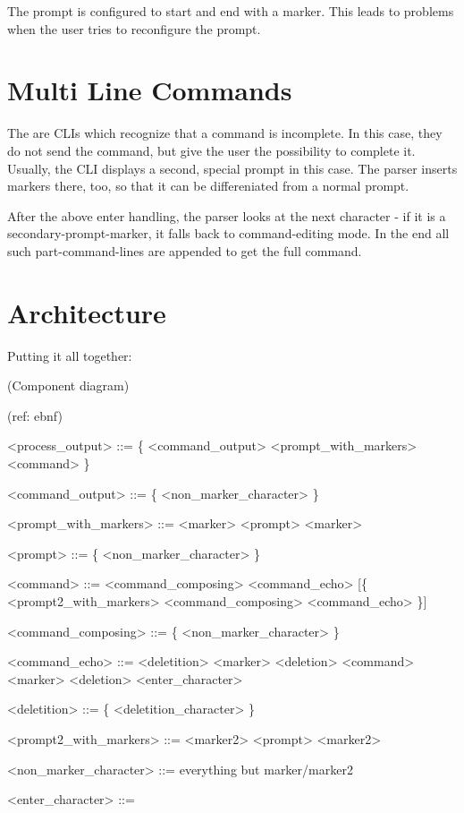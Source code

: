 \documentclass[twoside]{scrreprt}
\begin{document}
The prompt is configured to start and end with a marker. This leads to problems when the user tries to reconfigure the prompt.

\section{Multi Line Commands}

The are CLIs which recognize that a command is incomplete. In this case, they do not send the command, but give the user the possibility to complete it. Usually, the CLI displays a second, special prompt in this case. The parser inserts markers there, too, so that it can be differeniated from a normal prompt.

After the above enter handling, the parser looks at the next character - if it is a secondary-prompt-marker, it falls back to command-editing mode. In the end all such part-command-lines are appended to get the full command.

\section{Architecture}

Putting it all together:

(Component diagram)

(ref: ebnf)


\begin{grammar}
<process_output> ::= \{ <command_output> <prompt_with_markers> <command> \}

<command_output> ::= \{ <non_marker_character> \}

<prompt_with_markers> ::= <marker> <prompt> <marker>

<prompt> ::= \{ <non_marker_character> \}

<command> ::= <command_composing> <command_echo> [\{ <prompt2_with_markers>  <command_composing>  <command_echo> \}]

<command_composing> ::= \{ <non_marker_character> \}

<command_echo> ::= <deletition> <marker> <deletion>  <command>  <marker>  <deletion>  <enter_character>

<deletition> ::= \{ <deletition_character> \}

<prompt2_with_markers> ::= <marker2> <prompt> <marker2>

<non_marker_character> ::= everything but marker/marker2

<enter_character> ::= 
\end{grammar}
\end{document}

